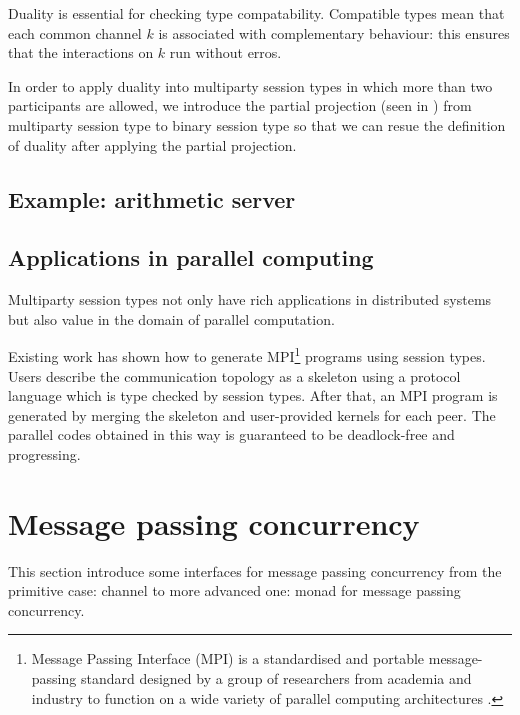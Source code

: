 Duality is essential for checking type compatability. Compatible types mean that each common channel $k$ is associated with complementary behaviour: this ensures that the interactions on $k$ run without erros. 

In order to apply duality into multiparty session types in which more than two participants are allowed, we introduce the partial projection (seen in \cite{coppoGentleIntroductionMultiparty2015}) from multiparty session type to binary session type so that we can resue the definition of duality after applying the partial projection.
\subsection{Example: arithmetic server}
\subsection{Applications in parallel computing} \label{b:mpst:app}
Multiparty session types not only have rich applications in distributed systems but also value in the domain of parallel computation. 

Existing work\cite{ngSafeMPICode} has shown how to generate MPI\footnote{Message Passing Interface (MPI) is a standardised and portable message-passing standard designed by a group of researchers from academia and industry to function on a wide variety of parallel computing architectures \cite{MessagePassingInterface2018}.} programs using session types. Users describe the communication topology as a skeleton using a protocol language which is type checked by session types. After that, an MPI program is generated by merging the skeleton and user-provided kernels for each peer. The parallel codes obtained in this way is guaranteed to be deadlock-free and progressing. 

\section{Message passing concurrency}
This section introduce some interfaces for message passing concurrency from the primitive case: channel to more advanced one: monad for message passing concurrency.


